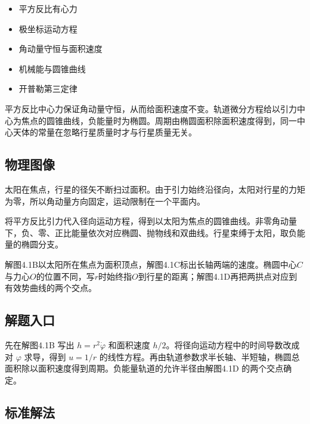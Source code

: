 \documentclass[UTF8,fontset=fandol,a4paper,11pt]{ctexart}
\providecommand{\tightlist}{\setlength{\itemsep}{0pt}\setlength{\parskip}{0pt}}
\begin{document}
\begin{itemize}
\tightlist
\item
  平方反比有心力
\item
  极坐标运动方程
\item
  角动量守恒与面积速度
\item
  机械能与圆锥曲线
\item
  开普勒第三定律
\end{itemize}

平方反比中心力保证角动量守恒，从而给面积速度不变。轨道微分方程给以引力中心为焦点的圆锥曲线，负能量时为椭圆。周期由椭圆面积除面积速度得到，同一中心天体的常量在忽略行星质量时才与行星质量无关。




\subsection*{物理图像}

太阳在焦点，行星的径矢不断扫过面积。由于引力始终沿径向，太阳对行星的力矩为零，所以角动量方向固定，运动限制在一个平面内。

将平方反比引力代入径向运动方程，得到以太阳为焦点的圆锥曲线。非零角动量下，负、零、正比能量依次对应椭圆、抛物线和双曲线。行星束缚于太阳，取负能量的椭圆分支。

解图4.1B以太阳所在焦点为面积顶点，解图4.1C标出长轴两端的速度。椭圆中心$C$与力心$O$的位置不同，写$r$时始终指$O$到行星的距离；解图4.1D再把两拱点对应到有效势曲线的两个交点。



\subsection*{解题入口}

先在解图4.1B 写出 $h=r^2\dot\varphi$ 和面积速度 $h/2$。将径向运动方程中的时间导数改成对 $\varphi$ 求导，得到 $u=1/r$ 的线性方程。再由轨道参数求半长轴、半短轴，椭圆总面积除以面积速度得到周期。负能量轨道的允许半径由解图4.1D 的两个交点确定。



\subsection*{标准解法}
\end{document}
